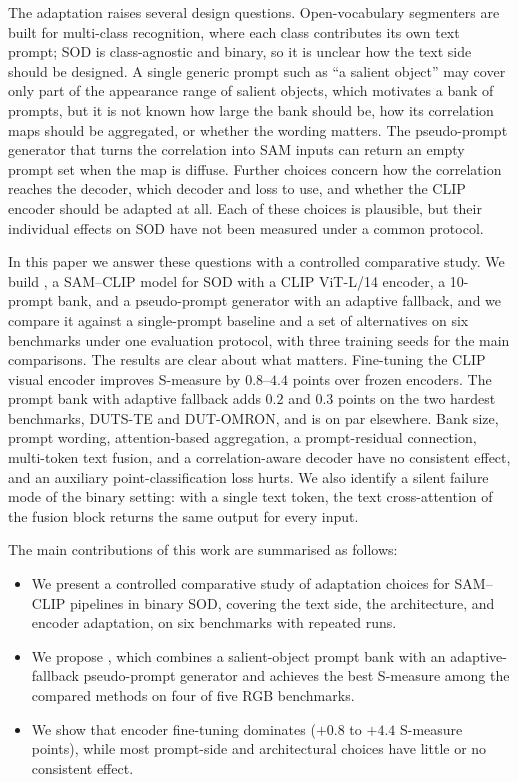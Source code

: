\begin{revpar}
The adaptation raises several design questions. Open-vocabulary segmenters are
built for multi-class recognition, where each class contributes its own text
prompt; SOD is class-agnostic and binary, so it is unclear how the text side
should be designed. A single generic prompt such as ``a salient object'' may
cover only part of the appearance range of salient objects, which motivates a
bank of prompts, but it is not known how large the bank should be, how its
correlation maps should be aggregated, or whether the wording matters. The
pseudo-prompt generator that turns the correlation into SAM inputs can return an
empty prompt set when the map is diffuse. Further choices concern how the
correlation reaches the decoder, which decoder and loss to use, and whether the
CLIP encoder should be adapted at all. Each of these choices is plausible, but
their individual effects on SOD have not been measured under a common protocol.

In this paper we answer these questions with a controlled comparative study. We
build \methodname{}, a SAM--CLIP model for SOD with a CLIP ViT-L/14 encoder, a
10-prompt bank, and a pseudo-prompt generator with an adaptive fallback, and we
compare it against a single-prompt baseline and a set of alternatives on six
benchmarks under one evaluation protocol, with three training seeds for the main
comparisons. The results are clear about what matters. Fine-tuning the CLIP
visual encoder improves S-measure by $0.8$--$4.4$ points over frozen encoders. The
prompt bank with adaptive fallback adds $0.2$ and $0.3$ points on the two hardest
benchmarks, DUTS-TE and DUT-OMRON, and is on par elsewhere. Bank size, prompt
wording, attention-based aggregation, a prompt-residual connection, multi-token
text fusion, and a correlation-aware decoder have no consistent effect, and an
auxiliary point-classification loss hurts. We also identify a silent failure mode
of the binary setting: with a single text token, the text cross-attention of the
fusion block returns the same output for every input.
\end{revpar}

\begin{revpar}
\noindent The main contributions of this work are summarised as follows:
\begin{itemize}
  \item We present a controlled comparative study of adaptation choices for
    SAM--CLIP pipelines in binary SOD, covering the text side, the architecture,
    and encoder adaptation, on six benchmarks with repeated runs.
  \item We propose \methodname{}, which combines a salient-object prompt bank with
    an adaptive-fallback pseudo-prompt generator and achieves the best S-measure
    among the compared methods on four of five RGB benchmarks.
  \item We show that encoder fine-tuning dominates ($+0.8$ to $+4.4$ S-measure
    points), while most prompt-side and architectural choices have little or no
    consistent effect.
\end{itemize}
\end{revpar}
